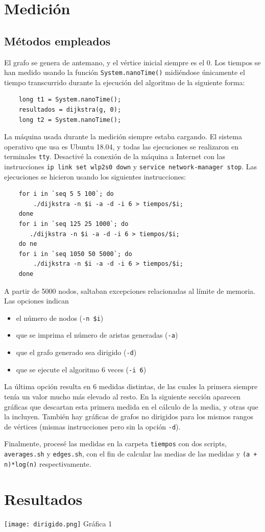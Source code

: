 \documentclass[12pt , a4paper]{article}
\begin{document}
\section{Medición}
\subsection{Métodos empleados}
	El grafo se genera de antemano, y el vértice inicial siempre es el 0. Los tiempos se han medido usando la función \texttt{System.nanoTime()} midiéndose únicamente el tiempo transcurrido durante la ejecución del algoritmo de la siguiente forma:
	\begin{verbatim}
	long t1 = System.nanoTime();
	resultados = dijkstra(g, 0);
	long t2 = System.nanoTime();
	\end{verbatim}
	
	La máquina usada durante la medición siempre estaba cargando. El sistema operativo que usa es Ubuntu 18.04, y todas las ejecuciones se realizaron en terminales \texttt{tty}. Desactivé la conexión de la máquina a Internet con las instrucciones \texttt{ip link set wlp2s0 down} y \texttt{service network-manager stop}. Las ejecuciones se hicieron usando los siguientes instrucciones:
	\begin{verbatim}
	for i in `seq 5 5 100`; do 
	    ./dijkstra -n $i -a -d -i 6 > tiempos/$i; 
	done
	for i in `seq 125 25 1000`; do 
	   ./dijkstra -n $i -a -d -i 6 > tiempos/$i;
	do ne
	for i in `seq 1050 50 5000`; do 
	    ./dijkstra -n $i -a -d -i 6 > tiempos/$i; 
	done
	\end{verbatim}
	A partir de 5000 nodos, saltaban excepciones relacionadas al límite de memoria. Las opciones indican
	\begin{itemize}
		\item el número de nodos (\texttt{-n \$i})
		\item que se imprima el número de aristas generadas (\texttt{-a})
		\item que el grafo generado sea dirigido (\texttt{-d})
		\item que se ejecute el algoritmo 6 veces (\texttt{-i 6})
	\end{itemize} 
	La última opción resulta en 6 medidas distintas, de las cuales la primera siempre tenía un valor mucho más elevado al resto. En la siguiente sección aparecen gráficas que descartan esta primera medida en el cálculo de la media, y otras que la incluyen. También hay gráficas de grafos no dirigidos para los mismos rangos de vértices (mismas instrucciones pero sin la opción \texttt{-d}).
	
	Finalmente, procesé las medidas en la carpeta \texttt{tiempos} con dos scripts, \texttt{averages.sh} y \texttt{edges.sh}, con el fin de calcular las medias de las medidas y \texttt{(a + n)*log(n)} respectivamente.
	
\section{Resultados}
\begin{center}
	\texttt{[image: dirigido.png]}
	Gráfica 1
\end{center}
\end{document}
